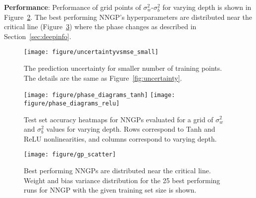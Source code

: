 \documentclass{article} %
\begin{document}
\begin{appendix}
{\bf Performance}: Performance of grid points of $\sigma_w^2$-$\sigma_b^2$ for varying depth is shown in Figure~\ref{fig:appendix_phase_diagram}. The best performing NNGP's hyperparameters are distributed near the critical line (Figure~\ref{fig:gp_scatter}) where the phase changes as described in Section~\ref{sec:deepinfo}.

\begin{figure}[ht]
  \centering
  \texttt{[image: figure/uncertaintyvsmse\_small]}
  \caption{ 
  The prediction uncertainty for smaller number of training points. The details are the same as Figure~\ref{fig:uncertainty}.}
  \label{fig:uncertainty_appendix}
\end{figure}

\begin{figure}[ht]
  \centering
  \texttt{[image: figure/phase\_diagrams\_tanh]}
  \texttt{[image: figure/phase\_diagrams\_relu]}

  \caption{Test set accuracy heatmaps for NNGPs evaluated for a grid of $\sigma_w^2$ and $\sigma_b^2$ values for varying depth. Rows correspond to Tanh and ReLU nonlinearities, and columns correspond to varying depth.}
  \label{fig:appendix_phase_diagram}
\end{figure}



\begin{figure}[ht!]
  \centering
  \texttt{[image: figure/gp\_scatter]}
  \caption{Best performing NNGPs are distributed near the critical line. Weight and bias variance distribution for the 25 best performing runs for NNGP with the given training set size is shown.}
  \label{fig:gp_scatter}
\end{figure}




\end{appendix}
\end{document}
